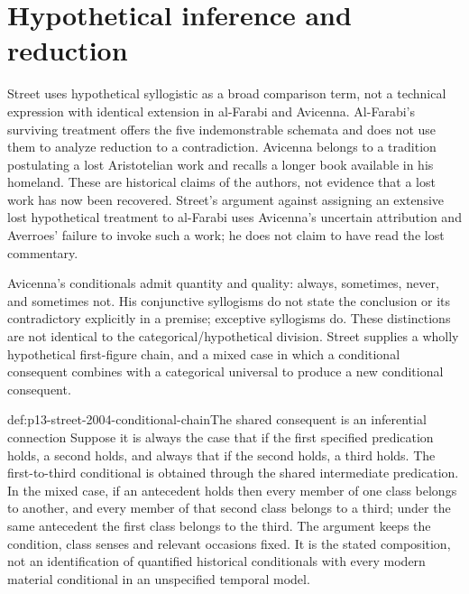 \section{Hypothetical inference and reduction}
\label{sec:p13-street-2004-hypothetical}

Street uses hypothetical syllogistic as a broad comparison
term, not a technical expression with identical extension
in al-Farabi and Avicenna. Al-Farabi's surviving treatment
offers the five indemonstrable schemata and does not use
them to analyze reduction to a contradiction. Avicenna
belongs to a tradition postulating a lost Aristotelian
work and recalls a longer book available in his homeland.
These are historical claims of the authors, not evidence
that a lost work has now been recovered. Street's argument
against assigning an extensive lost hypothetical treatment
to al-Farabi uses Avicenna's uncertain attribution and
Averroes' failure to invoke such a work; he does not
claim to have read the lost commentary.
\cite[pp.~543--545]{Street2004ArabicLogicHHL}

Avicenna's conditionals admit quantity and quality:
always, sometimes, never, and sometimes not. His
conjunctive syllogisms do not state the conclusion or
its contradictory explicitly in a premise; exceptive
syllogisms do. These distinctions are not identical
to the categorical/hypothetical division. Street
supplies a wholly hypothetical first-figure chain,
and a mixed case in which a conditional consequent
combines with a categorical universal to produce
a new conditional consequent.
\cite[pp.~545--547]{Street2004ArabicLogicHHL}

\begin{hbexample}{def:p13-street-2004-conditional-chain}{The shared consequent is an inferential connection}
Suppose it is always the case that if the first
specified predication holds, a second holds, and
always that if the second holds, a third holds.
The first-to-third conditional is obtained through
the shared intermediate predication. In the mixed
case, if an antecedent holds then every member of
one class belongs to another, and every member of
that second class belongs to a third; under the
same antecedent the first class belongs to the third.
The argument keeps the condition, class senses
and relevant occasions fixed. It is the stated
composition, not an identification of quantified
historical conditionals with every modern material
conditional in an unspecified temporal model.
\end{hbexample}

